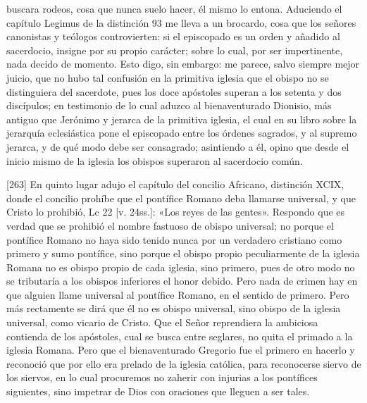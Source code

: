 buscara rodeos, cosa que nunca suelo hacer, él mismo lo entona. Aduciendo el capítulo Legimus de la distinción 93 me lleva a un brocardo, cosa que los señores canonistas y teólogos controvierten: si el episcopado es un orden y añadido al sacerdocio, insigne por su propio carácter; sobre lo cual, por ser impertinente, nada decido de momento. Esto digo, sin embargo: me parece, salvo siempre mejor juicio, que no hubo tal confusión en la primitiva iglesia que el obispo no se distinguiera del sacerdote, pues los doce apóstoles superan a los setenta y dos discípulos; en testimonio de lo cual aduzco al bienaventurado Dionisio, más antiguo que Jerónimo y jerarca de la primitiva iglesia, el cual en su libro sobre la jerarquía eclesiástica pone el episcopado entre los órdenes sagrados, y al supremo jerarca, y de qué modo debe ser consagrado; asintiendo a él, opino que desde el inicio mismo de la iglesia los obispos superaron al sacerdocio común.

[263] En quinto lugar adujo el capítulo del concilio Africano, distinción XCIX, donde el concilio prohíbe que el pontífice Romano deba llamarse universal, y que Cristo lo prohibió, Lc 22 [v. 24ss.]: «Los reyes de las gentes». Respondo que es verdad que se prohibió el nombre fastuoso de obispo universal; no porque el pontífice Romano no haya sido tenido nunca por un verdadero cristiano como primero y sumo pontífice, sino porque el obispo propio peculiarmente de la iglesia Romana no es obispo propio de cada iglesia, sino primero, pues de otro modo no se tributaría a los obispos inferiores el honor debido. Pero nada de crimen hay en que alguien llame universal al pontífice Romano, en el sentido de primero. Pero más rectamente se dirá que él no es obispo universal, sino obispo de la iglesia universal, como vicario de Cristo. Que el Señor reprendiera la ambiciosa contienda de los apóstoles, cual se busca entre seglares, no quita el primado a la iglesia Romana. Pero que el bienaventurado Gregorio fue el primero en hacerlo y reconoció que por ello era prelado de la iglesia católica, para reconocerse siervo de los siervos, en lo cual procuremos no zaherir con injurias a los pontífices siguientes, sino impetrar de Dios con oraciones que lleguen a ser tales.

